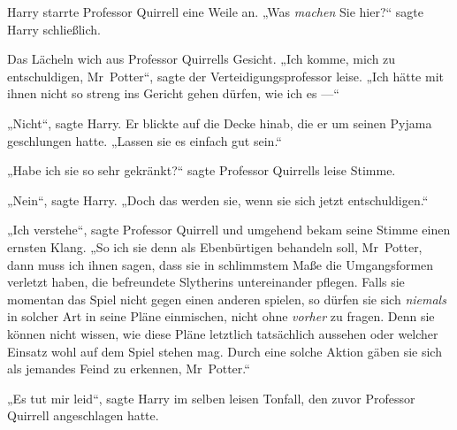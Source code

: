 Harry starrte Professor Quirrell eine Weile an.
„Was \emph{machen} Sie hier?“ sagte Harry schließlich.

Das Lächeln wich aus Professor Quirrells Gesicht.
„Ich komme, mich zu entschuldigen, Mr~Potter“, sagte der Verteidigungsprofessor leise.
„Ich hätte mit ihnen nicht so streng ins Gericht gehen dürfen, wie ich es —“

„Nicht“, sagte Harry. Er blickte auf die Decke hinab, die er um seinen Pyjama geschlungen hatte.
„Lassen sie es einfach gut sein.“

„Habe ich sie so sehr gekränkt?“ sagte Professor Quirrells leise Stimme.

„Nein“, sagte Harry.
„Doch das werden sie, wenn sie sich jetzt entschuldigen.“

„Ich verstehe“, sagte Professor Quirrell und umgehend bekam seine Stimme einen ernsten Klang.
„So ich sie denn als Ebenbürtigen behandeln soll, Mr~Potter, dann muss ich ihnen sagen, dass sie in schlimmstem Maße die Umgangsformen verletzt haben, die befreundete Slytherins untereinander pflegen. Falls sie momentan das Spiel nicht gegen einen anderen spielen, so dürfen sie sich \emph{niemals} in solcher Art in seine Pläne einmischen, nicht ohne \emph{vorher} zu fragen. Denn sie können nicht wissen, wie diese Pläne letztlich tatsächlich aussehen oder welcher Einsatz wohl auf dem Spiel stehen mag. Durch eine solche Aktion gäben sie sich als jemandes Feind zu erkennen, Mr~Potter.“

„Es tut mir leid“, sagte Harry im selben leisen Tonfall, den zuvor Professor Quirrell angeschlagen hatte.

